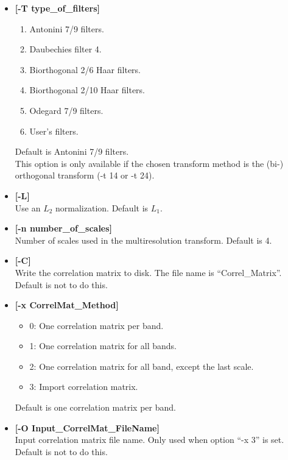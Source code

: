 \begin{itemize}
{\begin{enumerate}
\item Undecimated (bi-) orthogonal wavelet transform. \\
Antonini 7/9 filters ~\cite{wave:antonini92} are used by default, with an 
$L_1$ normalization. The filters can be changed using the ``-T'' option, and
an $L_2$ normalization is obtained by ``-L'' option.
\end{enumerate}}
Default is 2.
\item {\bf [-T type\_of\_filters]}  
{\small
\begin{enumerate}
\baselineskip=0.4truecm
\itemsep=0.1truecm
\item Antonini 7/9 filters. 
\item Daubechies filter 4. 
\item Biorthogonal 2/6 Haar filters.
\item Biorthogonal 2/10 Haar filters.
\item Odegard 7/9 filters.
\item User's filters.
\end{enumerate}}
Default is Antonini 7/9 filters. \\
 This option is only available if the chosen transform method is
 the (bi-) orthogonal transform (-t 14 or -t 24).
\item {\bf [-L]} \\
Use an $L_2$ normalization. Default is $L_1$.
 \item {\bf [-n number\_of\_scales]} \\
 Number of scales used in the multiresolution transform.
 Default is 4.
\item {\bf [-C]} \\
Write the correlation matrix to disk. 
The file name is ``Correl\_Matrix''. Default is not to do this.
\item {\bf [-x CorrelMat\_Method]}
{\small
\begin{itemize}      
\baselineskip=0.4truecm
\itemsep=0.1truecm       
\item{0:} One correlation matrix per band. 
\item{1:} One correlation matrix for all bands. 
\item{2:} One correlation matrix for all band, except the last scale. 
\item{3:} Import correlation matrix.
\end{itemize}
Default is one correlation matrix per band.
}             
\item {\bf [-O Input\_CorrelMat\_FileName]} \\
Input correlation matrix file name.
Only used when option ``-x 3'' is set. Default is not to do this.
\end{itemize}

